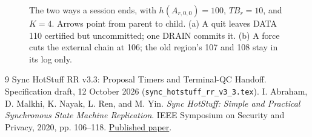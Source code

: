 \documentclass[11pt,a4paper]{article}
\newcommand{\TB}{\mathit{TB}}
\begin{document}
\begin{figure}[htbp]\centering

\caption{The two ways a session ends, with $h(A_{r,0,0})=100$, $\TB_r=10$,
and $K=4$. Arrows point from parent to child. (a) A quit leaves DATA 110
certified but uncommitted; one DRAIN commits it. (b) A force cuts the
external chain at 106; the old region's 107 and 108 stay in its log
only.}
\label{fig:endings}
\end{figure}

\begingroup\small
\begin{thebibliography}{9}
Sync HotStuff RR v3.3: Proposal Timers and Terminal-QC Handoff.
Specification draft, 12 October 2026 (\texttt{sync\_hotstuff\_rr\_v3\_3.tex}).
I. Abraham, D. Malkhi, K. Nayak, L. Ren, and M. Yin.
\emph{Sync HotStuff: Simple and Practical Synchronous State Machine Replication}.
IEEE Symposium on Security and Privacy, 2020, pp. 106--118.
\href{https://conferences.computer.org/sp/pdfs/sp/2020/349700a106.pdf}{Published paper}.
\end{thebibliography}
\endgroup
\end{document}
